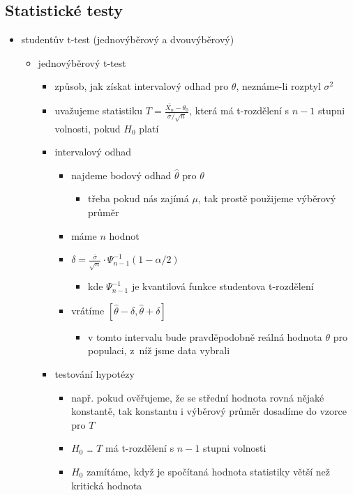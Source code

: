 \subsection{Statistické testy}
\begin{itemize}
\item studentův t-test (jednovýběrový a dvouvýběrový)
\begin{itemize}
\item jednovýběrový t-test
\begin{itemize}
\item způsob, jak získat intervalový odhad pro $\theta$, neznáme-li rozptyl $\sigma^2$
\item uvažujeme statistiku $T=\frac{\overline{X_n}-\theta_0}{\bar\sigma/\sqrt n}$, která má t-rozdělení s $n-1$ stupni volnosti, pokud $H_0$ platí
\item intervalový odhad
\begin{itemize}
\item najdeme bodový odhad $\hat\theta$ pro $\theta$
\begin{itemize}
\item třeba pokud nás zajímá $\mu$, tak prostě použijeme výběrový průměr
\end{itemize}
\item máme $n$ hodnot
\item $\delta=\frac{\bar\sigma}{\sqrt n}\cdot \Psi^{-1}_{n-1}(1-\alpha/2)$
\begin{itemize}
\item kde $\Psi^{-1}_{n-1}$ je kvantilová funkce studentova t-rozdělení
\end{itemize}
\item vrátíme $[\hat\theta-\delta,\hat\theta+\delta]$
\begin{itemize}
\item v tomto intervalu bude pravděpodobně reálná hodnota $\theta$ pro populaci, z~níž jsme data vybrali
\end{itemize}
\end{itemize}
\item testování hypotézy
\begin{itemize}
\item např. pokud ověřujeme, že se střední hodnota rovná nějaké konstantě, tak konstantu i výběrový průměr dosadíme do vzorce pro $T$
\item $H_0$ \dots{} $T$ má t-rozdělení s $n-1$ stupni volnosti
\item $H_0$ zamítáme, když je spočítaná hodnota statistiky větší než kritická hodnota
\end{itemize}

\end{itemize}
\end{itemize}
\end{itemize}
